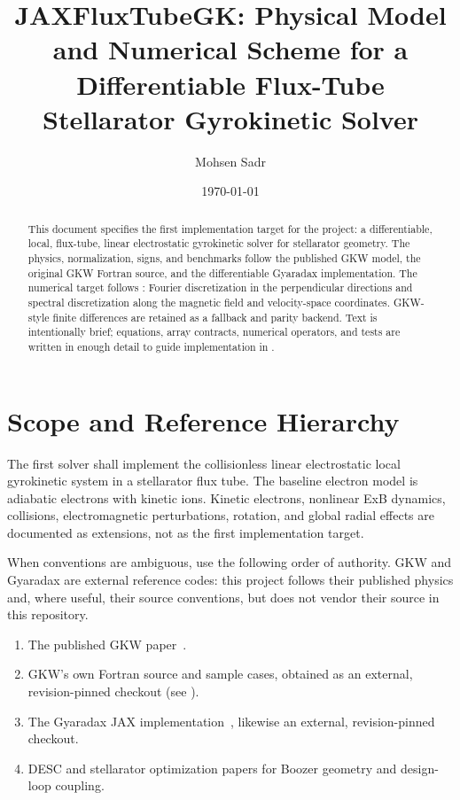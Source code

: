 \documentclass[11pt,a4paper]{article}
\title{JAXFluxTubeGK: Physical Model and Numerical Scheme for a Differentiable Flux-Tube Stellarator Gyrokinetic Solver}
\author{Mohsen Sadr}
\date{\today}
\begin{document}
\maketitle

\begin{abstract}
This document specifies the first implementation target for the project: a differentiable, local, flux-tube, linear electrostatic gyrokinetic solver for stellarator geometry.  The physics, normalization, signs, and benchmarks follow the published GKW model, the original GKW Fortran source, and the differentiable Gyaradax implementation.  The numerical target follows : Fourier discretization in the perpendicular directions and spectral discretization along the magnetic field and velocity-space coordinates.  GKW-style finite differences are retained as a fallback and parity backend.  Text is intentionally brief; equations, array contracts, numerical operators, and tests are written in enough detail to guide implementation in .
\end{abstract}

\tableofcontents

\section{Scope and Reference Hierarchy}

The first solver shall implement the collisionless linear electrostatic local gyrokinetic system in a stellarator flux tube.  The baseline electron model is adiabatic electrons with kinetic ions.  Kinetic electrons, nonlinear ExB dynamics, collisions, electromagnetic perturbations, rotation, and global radial effects are documented as extensions, not as the first implementation target.

When conventions are ambiguous, use the following order of authority.  GKW
and Gyaradax are external reference codes: this project follows their
published physics and, where useful, their source conventions, but does not
vendor their source in this repository.
\begin{enumerate}
  \item The published GKW paper~\cite{peeters2009gkw}.
  \item GKW's own Fortran source and sample cases, obtained as an external,
  revision-pinned checkout (see ).
  \item The Gyaradax JAX implementation~\cite{gyaradax}, likewise an
  external, revision-pinned checkout.
  \item DESC and stellarator optimization papers for Boozer geometry and design-loop coupling.
\end{enumerate}
\end{document}
